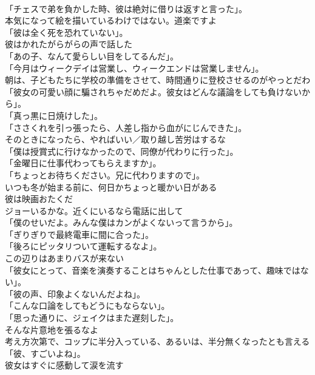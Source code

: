 \documentclass[8pt]{extreport}
\begin{document}
\begin{CJK}{UTF8}{min}
\\	「チェスで弟を負かした時、彼は絶対に借りは返すと言った」。	
\\	本気になって絵を描いているわけではない。道楽ですよ	
\\	「彼は全く死を恐れていない」。	
\\	彼はかれたがらがらの声で話した	
\\	「あの子、なんて愛らしい目をしてるんだ」。	
\\	「今月はウィークデイは営業し、ウィークエンドは営業しません」。	
\\	朝は、子どもたちに学校の準備をさせて、時間通りに登校させるのがやっとだわ	
\\	「彼女の可愛い顔に騙されちゃだめだよ。彼女はどんな議論をしても負けないから」。	
\\	「真っ黒に日焼けした」。	
\\	「ささくれを引っ張ったら、人差し指から血がにじんできた」。	
\\	そのときになったら、やればいい／取り越し苦労はするな	
\\	「僕は授賞式に行けなかったので、同僚が代わりに行った」。	
\\	「金曜日に仕事代わってもらえますか」。	
\\	「ちょっとお待ちください。兄に代わりますので」。	
\\	いつも冬が始まる前に、何日かちょっと暖かい日がある	
\\	彼は映画おたくだ	
\\	ジョーいるかな。近くにいるなら電話に出して	
\\	「僕のせいだよ。みんな僕はカンがよくないって言うから」。	
\\	「ぎりぎりで最終電車に間に合った」。	
\\	「後ろにピッタリついて運転するなよ」。	
\\	この辺りはあまりバスが来ない	
\\	「彼女にとって、音楽を演奏することはちゃんとした仕事であって、趣味ではない」。	
\\	「彼の声、印象よくないんだよね」。	
\\	「こんな口論をしてもどうにもならない」。	
\\	「思った通りに、ジェイクはまた遅刻した」。	
\\	そんな片意地を張るなよ	
\\	考え方次第で、コップに半分入っている、あるいは、半分無くなったとも言える	
\\	「彼、すごいよね」。	
\\	彼女はすぐに感動して涙を流す	

\end{CJK}
\end{document}
